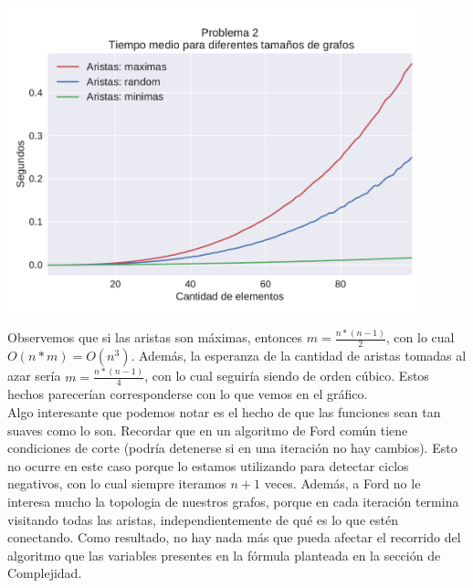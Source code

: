 {\centering
  \includegraphics[width=0.9\textwidth]{imagenes/problema2/n_aristas.pdf} \\
}

Observemos que si las aristas son máximas, entonces $m = \frac{n*(n-1)}{2}$, con lo cual $O(n*m) = O(n^3)$. Además, la esperanza de la cantidad de aristas tomadas al azar sería $m = \frac{n*(n-1)}{4}$, con lo cual seguiría siendo de orden cúbico. Estos hechos parecerían corresponderse con lo que vemos en el gráfico. \\

Algo interesante que podemos notar es el hecho de que las funciones sean tan suaves como lo son. Recordar que en un algoritmo de Ford común tiene condiciones de corte (podría detenerse si en una iteración no hay cambios). Esto no ocurre en este caso porque lo estamos utilizando para detectar ciclos negativos, con lo cual siempre iteramos $n+1$ veces. Además, a Ford no le interesa mucho la topologia de nuestros grafos, porque en cada iteración termina visitando todas las aristas, independientemente de qué es lo que estén conectando. Como resultado, no hay nada más que pueda afectar el recorrido del algoritmo que las variables presentes en la fórmula planteada en la sección de Complejidad.